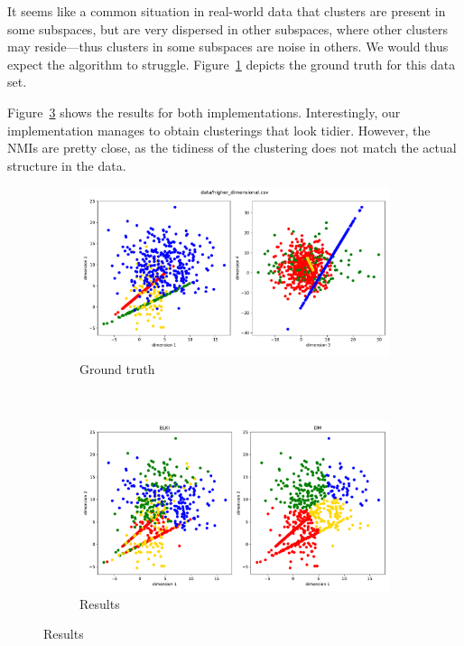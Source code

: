 \documentclass[english]{scrartcl}
\begin{document}
It seems like a common situation in real-world data that clusters are present
in some subspaces, but are very dispersed in other subspaces, where other
clusters may reside---thus clusters in some subspaces are noise in others. We
would thus expect the algorithm to struggle. Figure~\ref{fig:true_higher_dim} depicts
the ground truth for this data set.

Figure~\ref{fig:higher_dim_res} shows the results for both implementations.
Interestingly, our implementation manages to obtain clusterings that
look tidier. However, the NMIs are pretty close, as the tidiness of
the clustering does not match the actual structure in the data.

\begin{figure}[p]
    \centering
    \begin{subfigure}{\textwidth}
        \includegraphics[width=\textwidth]{img/higher_dimensional}
        \caption{Ground truth}
        \label{fig:true_higher_dim}
    \end{subfigure}%
    \\
    \begin{subfigure}{\textwidth}
        \includegraphics[width=\textwidth]{img/higher_dimensional_cmp}
        \caption{Results}
        \label{fig:higher_dim_res}
    \end{subfigure}
\end{figure}
\end{document}
